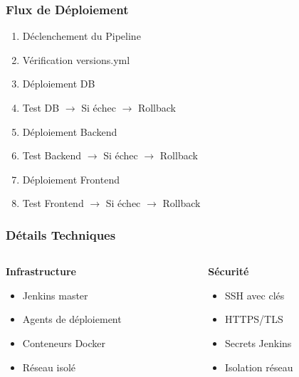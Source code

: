 \documentclass[aspectratio=169]{beamer}
\begin{document}
\begin{frame}
    \frametitle{Flux de Déploiement}
    \begin{enumerate}
        \item Déclenchement du Pipeline
        \item[\textrightarrow] Vérification versions.yml
        \item[\textrightarrow] Déploiement DB
        \item[\textrightarrow] Test DB $\rightarrow$ Si échec $\rightarrow$ Rollback
        \item[\textrightarrow] Déploiement Backend
        \item[\textrightarrow] Test Backend $\rightarrow$ Si échec $\rightarrow$ Rollback
        \item[\textrightarrow] Déploiement Frontend
        \item[\textrightarrow] Test Frontend $\rightarrow$ Si échec $\rightarrow$ Rollback
    \end{enumerate}
\end{frame}

\begin{frame}
    \frametitle{Détails Techniques}
    \begin{columns}[t]
        \begin{column}{0.5\textwidth}
            \textbf{Infrastructure}
            \begin{itemize}
                \item Jenkins master
                \item Agents de déploiement
                \item Conteneurs Docker
                \item Réseau isolé
            \end{itemize}
        \end{column}
        \begin{column}{0.5\textwidth}
            \textbf{Sécurité}
            \begin{itemize}
                \item SSH avec clés
                \item HTTPS/TLS
                \item Secrets Jenkins
                \item Isolation réseau
            \end{itemize}
        \end{column}
    \end{columns}
\end{frame}
\end{document}
